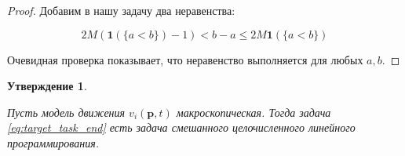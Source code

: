 \documentclass[12pt, a4paper]{article}
\newtheorem{state}{Утверждение}[section]
\begin{document}
\begin{proof}
	Добавим в нашу задачу два неравенства:
	
	$$ 2M (\textbf{1} (\{a < b\}) - 1) < b - a \le 2M\textbf{1} (\{a < b\}) $$
	
	Очевидная проверка показывает, что неравенство выполняется для любых $a, b$.
	
	
\end{proof}

\begin{state}
	
	\label{state:lin_prog}
	
	Пусть модель движения $ v_i(\textbf{p}, t)$ макроскопическая. Тогда задача \eqref{eq:target_task_end} есть задача смешанного целочисленного линейного программирования.
\end{state}
\end{document}
